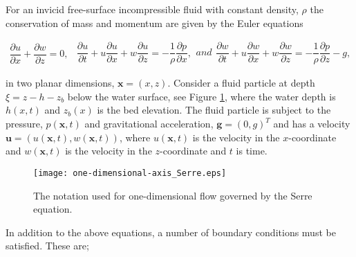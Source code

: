 \documentclass[SingleSpace,12pt]{Serre_ASCE}
\begin{document}
For an invicid free-surface incompressible fluid with constant density, $\rho$ the conservation of mass and momentum are given by the Euler equations
\begin{linenomath*}
\begin{subequations}
\begin{gather}
\dfrac{\partial u}{\partial x} + \dfrac{\partial w}{\partial z} =  0,
\label{eq:Euler_continuity}
\end{gather}
\begin{gather}
\dfrac{\partial u}{\partial t} + u \dfrac{\partial u}{\partial x} + w \dfrac{\partial u}{\partial z} = -\dfrac{1}{\rho} \dfrac{\partial p}{\partial x},
\label{eq:Euler_momentum_x}
\end{gather}
and
\begin{gather}
\dfrac{\partial w}{\partial t} + u \dfrac{\partial w}{\partial x} +  w \dfrac{\partial w}{\partial z} = -\dfrac{1}{\rho} \dfrac{\partial p}{\partial z} - g,
\label{eq:Euler_momentum_z}
\end{gather}
\label{eq:Euler_governing_equations}
\end{subequations}
\end{linenomath*}
in two planar dimensions, $\textbf{x} = (x,z)$. Consider a fluid particle at depth  $\xi = z - h - z_b$ below the water surface, see Figure \ref{fig:Notation}, where the water depth is $h(x,t)$ and $z_b(x)$ is the bed elevation. The fluid particle is subject to the pressure, $p(\textbf{x},t)$ and  gravitational acceleration, $\textbf{g} = (0,g)^T$ and has a velocity $\textbf{u} = (u(\textbf{x},t),w(\textbf{x},t))$,  where $u(\textbf{x},t)$ is the velocity in the $x$-coordinate and $w(\textbf{x},t)$ is the velocity in the $z$-coordinate and $t$ is time.
\begin{figure}[htb]
\begin{center}
\texttt{[image: one-dimensional-axis\_Serre.eps]}
\end{center}
\caption{The notation used for one-dimensional flow governed by the Serre equation.}
\label{fig:Notation}
\end{figure}
In addition to the above equations, a number of boundary conditions must be satisfied. These are;
\end{document}
